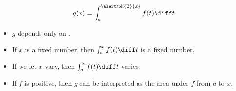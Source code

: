 \begin{frame}
\[
g(x) = \int_a^{\alertNoH{ 2}{x}}  f(t) \diff t%
\]
\begin{itemize}
\item<2->  $g$ depends only on .
\item<3->  If $x$ is a fixed number, then $\int_a^x f(t)\diff t$ is a fixed number.
\item<4->  If we let $x$ vary, then $\int_a^x f(t)\diff t$ varies.
\item<5->  If $f$ is positive, then $g$ can be interpreted as the area under $f$ from $a$ to $x$.
\end{itemize}
\end{frame}
